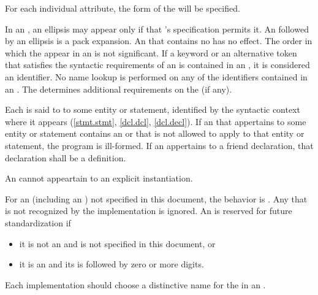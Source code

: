 \pnum
\begin{note}
For each individual attribute, the form of the
 will be specified.
\end{note}

\pnum
In an , an ellipsis may appear only if that
's specification permits it. An  followed
by an ellipsis is a pack expansion.
An  that contains no  has no
effect. The order in which the  appear in an
 is not significant. If a
keyword
or an alternative token that satisfies the syntactic requirements
of an  is
contained in
an , it is considered an identifier. No name
lookup is performed on any of the identifiers contained in an
. The  determines additional
requirements on the  (if any).

\pnum
Each  is said to  to some entity or
statement, identified by the syntactic context where it appears
(\ref{stmt.stmt}, \ref{dcl.dcl},
\ref{dcl.decl}). If an  that appertains to some
entity or statement contains an  or  that
is not allowed to apply to that
entity or statement, the program is ill-formed. If an 
appertains to a friend declaration, that declaration shall be a
definition.
\begin{note}
An  cannot appeartain to
an explicit instantiation.
\end{note}

\pnum
For an 
(including an )
not specified in this document, the
behavior is .
Any  that is not recognized by the implementation
is ignored.
An  is reserved for future standardization if
\begin{itemize}
\item it is not an  and
is not specified in this document, or
\item it is an  and
its  is
 followed by zero or more digits.
\end{itemize}
\begin{note}
Each implementation should choose a distinctive name for the
 in an .
\end{note}

